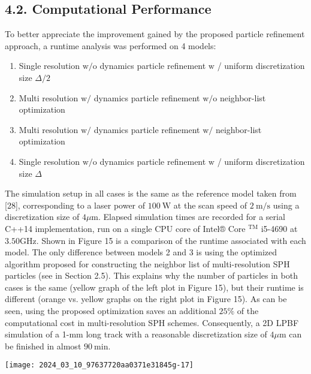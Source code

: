 \documentclass[10pt]{article}
\begin{document}
\subsection*{4.2. Computational Performance}
To better appreciate the improvement gained by the proposed particle refinement approach, a runtime analysis was performed on 4 models:

\begin{enumerate}
  \item Single resolution $\mathrm{w} / \mathrm{o}$ dynamics particle refinement $\mathrm{w}$ / uniform discretization size $\Delta / 2$

  \item Multi resolution $\mathrm{w} /$ dynamics particle refinement $\mathrm{w} / \mathrm{o}$ neighbor-list optimization

  \item Multi resolution $\mathrm{w} /$ dynamics particle refinement $\mathrm{w} /$ neighbor-list optimization

  \item Single resolution $\mathrm{w} / \mathrm{o}$ dynamics particle refinement $\mathrm{w}$ / uniform discretization size $\Delta$

\end{enumerate}

The simulation setup in all cases is the same as the reference model taken from [28], corresponding to a laser power of $100 \mathrm{~W}$ at the scan speed of $2 \mathrm{~m} / \mathrm{s}$ using a discretization size of $4 \mu \mathrm{m}$. Elapsed simulation times are recorded for a serial C++14 implementation, run on a single CPU core of Intel® Core $^{\mathrm{TM}}$ i5-4690 at $3.50 \mathrm{GHz}$. Shown in Figure 15 is a comparison of the runtime associated with each model. The only difference between models 2 and 3 is using the optimized algorithm proposed for constructing the neighbor list of multi-resolution SPH particles (see in Section 2.5). This explains why the number of particles in both cases is the same (yellow graph of the left plot in Figure 15), but their runtime is different (orange vs. yellow graphs on the right plot in Figure 15). As can be seen, using the proposed optimization saves an additional $25 \%$ of the computational cost in multi-resolution SPH schemes. Consequently, a 2D LPBF simulation of a 1-mm long track with a reasonable discretization size of $4 \mu \mathrm{m}$ can be finished in almost $90 \mathrm{~min}$.

\begin{center}
\texttt{[image: 2024\_03\_10\_97637720aa0371e31845g-17]}
\end{center}
\end{document}
